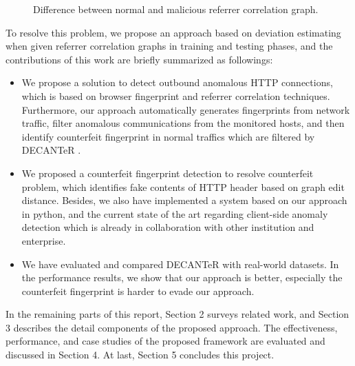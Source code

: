 \begin{figure}[!tbp]
  \centering
  \hfill
  \caption{Difference between normal and malicious referrer correlation graph.}
\label{fig:length_count}
\end{figure}

To resolve this problem, we propose an approach based on deviation estimating when given referrer correlation graphs in training and testing phases, and the contributions of this work are briefly summarized as followings:

\begin{itemize}

\item We propose a solution to detect outbound anomalous HTTP connections, which is based on browser fingerprint and referrer correlation techniques. Furthermore, our approach automatically generates  fingerprints from network traffic, filter anomalous communications from the monitored hosts, and then identify counterfeit fingerprint in normal traffics which are filtered by DECANTeR \cite{bortolameotti2017decanter}.

\item We proposed a counterfeit fingerprint detection to resolve counterfeit problem, which identifies fake contents of HTTP header based on graph edit distance. Besides, we also have implemented a system based on our approach in python, and the current state of the art regarding client-side anomaly detection which is already in collaboration with other institution and enterprise. 

\item We have evaluated and compared DECANTeR \cite{bortolameotti2017decanter} with real-world datasets. In the performance results, we show that our approach is better, especially the counterfeit fingerprint is harder to evade our approach.

\end{itemize}

In the remaining parts of this report, Section 2 surveys related work, and Section 3 describes the detail components of the proposed approach. The effectiveness, performance, and case studies of the proposed framework are evaluated and discussed in Section 4. At last, Section 5 concludes this project.
